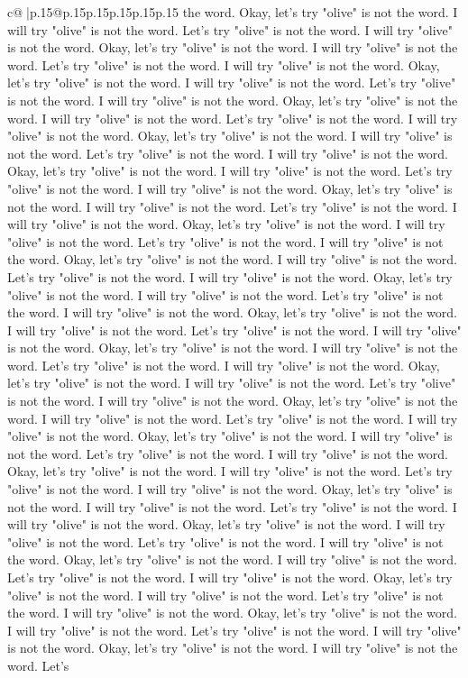 \documentclass{article}
\begin{document}
{\begin{supertabular}{c@{$\;$}|p{.15\linewidth}@{}p{.15\linewidth}p{.15\linewidth}p{.15\linewidth}p{.15\linewidth}p{.15\linewidth}}
{{{the word. Okay, let's try "olive" is not the word. I will try "olive" is not the word. Let's try "olive" is not the word. I will try "olive" is not the word. Okay, let's try "olive" is not the word. I will try "olive" is not the word. Let's try "olive" is not the word. I will try "olive" is not the word. Okay, let's try "olive" is not the word. I will try "olive" is not the word. Let's try "olive" is not the word. I will try "olive" is not the word. Okay, let's try "olive" is not the word. I will try "olive" is not the word. Let's try "olive" is not the word. I will try "olive" is not the word. Okay, let's try "olive" is not the word. I will try "olive" is not the word. Let's try "olive" is not the word. I will try "olive" is not the word. Okay, let's try "olive" is not the word. I will try "olive" is not the word. Let's try "olive" is not the word. I will try "olive" is not the word. Okay, let's try "olive" is not the word. I will try "olive" is not the word. Let's try "olive" is not the word. I will try "olive" is not the word. Okay, let's try "olive" is not the word. I will try "olive" is not the word. Let's try "olive" is not the word. I will try "olive" is not the word. Okay, let's try "olive" is not the word. I will try "olive" is not the word. Let's try "olive" is not the word. I will try "olive" is not the word. Okay, let's try "olive" is not the word. I will try "olive" is not the word. Let's try "olive" is not the word. I will try "olive" is not the word. Okay, let's try "olive" is not the word. I will try "olive" is not the word. Let's try "olive" is not the word. I will try "olive" is not the word. Okay, let's try "olive" is not the word. I will try "olive" is not the word. Let's try "olive" is not the word. I will try "olive" is not the word. Okay, let's try "olive" is not the word. I will try "olive" is not the word. Let's try "olive" is not the word. I will try "olive" is not the word. Okay, let's try "olive" is not the word. I will try "olive" is not the word. Let's try "olive" is not the word. I will try "olive" is not the word. Okay, let's try "olive" is not the word. I will try "olive" is not the word. Let's try "olive" is not the word. I will try "olive" is not the word. Okay, let's try "olive" is not the word. I will try "olive" is not the word. Let's try "olive" is not the word. I will try "olive" is not the word. Okay, let's try "olive" is not the word. I will try "olive" is not the word. Let's try "olive" is not the word. I will try "olive" is not the word. Okay, let's try "olive" is not the word. I will try "olive" is not the word. Let's try "olive" is not the word. I will try "olive" is not the word. Okay, let's try "olive" is not the word. I will try "olive" is not the word. Let's try "olive" is not the word. I will try "olive" is not the word. Okay, let's try "olive" is not the word. I will try "olive" is not the word. Let's try "olive" is not the word. I will try "olive" is not the word. Okay, let's try "olive" is not the word. I will try "olive" is not the word. Let's try "olive" is not the word. I will try "olive" is not the word. Okay, let's try "olive" is not the word. I will try "olive" is not the word. Let's }}}
\end{supertabular}}
\end{document}
